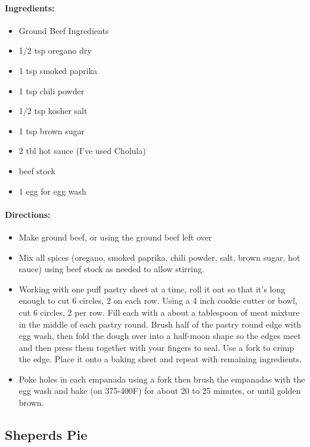 \documentclass{article}
\begin{document}
\paragraph{Ingredients:}
\begin{itemize}
  \item Ground Beef Ingredients
  \item 1/2 tsp oregano dry
  \item 1 tsp smoked paprika
  \item 1 tsp chili powder
  \item 1/2 tsp kosher salt
  \item 1 tsp brown sugar
  \item 2 tbl hot sauce (I’ve used Cholula)
  \item beef stock
  \item 1 egg for egg wash
\end{itemize}

\paragraph{Directions:}
\begin{itemize}
  \item Make ground beef, or using the ground beef left over
  \item Mix all spices (oregano, smoked paprika, chili powder, salt, brown sugar, hot sauce) using beef
stock as needed to allow stirring.
  \item Working with one puff pastry sheet at a time, roll it out so that it’s long enough to cut 6 circles, 2 on each
row. Using a 4 inch cookie cutter or bowl, cut 6 circles, 2 per row. Fill each with a about a tablespoon
of meat mixture in the middle of each pastry round. Brush half of the pastry round edge with egg wash,
then fold the dough over into a half-moon shape so the edges meet and then press them together with
your fingers to seal. Use a fork to crimp the edge. Place it onto a baking sheet and repeat with remaining
ingredients.
  \item Poke holes in each empanada using a fork then brush the empanadas with the egg wash and bake (on 375-400F) for about 20 to 25 minutes, or until golden brown.
\end{itemize}


\subsection{Sheperds Pie}
\end{document}
